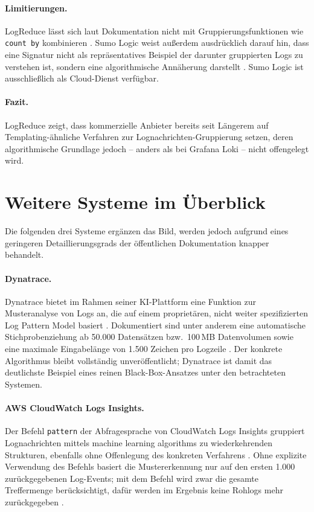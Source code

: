 \paragraph{Limitierungen.}
LogReduce lässt sich laut Dokumentation nicht mit Gruppierungsfunktionen wie \texttt{count by} kombinieren \cite{sumologicLogReduceDetectPatterns}. Sumo Logic weist außerdem ausdrücklich darauf hin, dass eine Signatur nicht als repräsentatives Beispiel der darunter gruppierten Logs zu verstehen ist, sondern eine algorithmische Annäherung darstellt \cite{sumologicLogReduceDetectPatterns}. Sumo Logic ist ausschließlich als Cloud-Dienst verfügbar.

\paragraph{Fazit.}
LogReduce zeigt, dass kommerzielle Anbieter bereits seit Längerem auf Templating-ähnliche Verfahren zur Lognachrichten-Gruppierung setzen, deren algorithmische Grundlage jedoch -- anders als bei Grafana Loki -- nicht offengelegt wird.

\section{Weitere Systeme im Überblick}
\label{sec:kommerziell_weitere}

Die folgenden drei Systeme ergänzen das Bild, werden jedoch aufgrund eines geringeren Detaillierungsgrads der öffentlichen Dokumentation knapper behandelt.

\paragraph{Dynatrace.}
Dynatrace bietet im Rahmen seiner KI-Plattform eine Funktion zur Musteranalyse von Logs an, die auf einem proprietären, nicht weiter spezifizierten \glqq Log Pattern Model\grqq{} basiert \cite{dynatraceAnalyzeLogPatterns}. Dokumentiert sind unter anderem eine automatische Stichprobenziehung ab 50.000 Datensätzen bzw.\ 100\,MB Datenvolumen sowie eine maximale Eingabelänge von 1.500 Zeichen pro Logzeile \cite{dynatraceAnalyzeLogPatterns}. Der konkrete Algorithmus bleibt vollständig unveröffentlicht; Dynatrace ist damit das deutlichste Beispiel eines reinen Black-Box-Ansatzes unter den betrachteten Systemen.

\paragraph{AWS CloudWatch Logs Insights.}
Der Befehl \texttt{pattern} der Abfragesprache von CloudWatch Logs Insights gruppiert Lognachrichten mittels \glqq machine learning algorithms\grqq{} zu wiederkehrenden Strukturen, ebenfalls ohne Offenlegung des konkreten Verfahrens \cite{awsCloudwatchPatternAnalysis}. Ohne explizite Verwendung des Befehls basiert die Mustererkennung nur auf den ersten 1.000 zurückgegebenen Log-Events; mit dem Befehl wird zwar die gesamte Treffermenge berücksichtigt, dafür werden im Ergebnis keine Rohlogs mehr zurückgegeben \cite{awsCloudwatchPatternAnalysis}.

